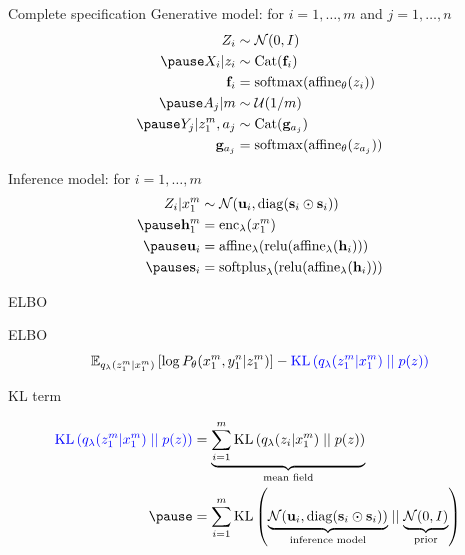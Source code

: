 \begin{frame}[plain]{Complete specification}
Generative model: for $i=1, \ldots, m$ and $j=1, \ldots, n$ \pause
\begin{equation*}
\begin{aligned}
Z_i &\sim \mathcal N(0, I) \\ \pause
X_i|z_i &\sim \Cat(\mathbf f_i) \\ 
\mathbf f_i &= \softmax(\affine_\theta(z_i)) \\ \pause
A_j|m &\sim \mathcal U(1/m) \\ \pause
Y_j|z_1^m, a_j &\sim \Cat(\mathbf g_{a_j}) \\
\mathbf g_{a_j} &= \softmax(\affine_\theta(z_{a_j}))
\end{aligned}
\end{equation*}

Inference model: for $i=1, \ldots, m$ \pause
\begin{equation*}
\begin{aligned}
Z_i|x_1^m &\sim \mathcal N(\mathbf u_i, \diag(\mathbf s_i \odot \mathbf s_i))\\ \pause
\mathbf h_1^m &= \text{enc}_\lambda(x_1^m) \\ \pause
\mathbf u_i &= \text{affine}_\lambda(\relu(\text{affine}_\lambda(\mathbf h_i)))\\ \pause
\mathbf s_i &= \softplus_\lambda(\relu(\text{affine}_\lambda(\mathbf h_i))) 
\end{aligned}
\end{equation*}

\end{frame}

\begin{frame}{ELBO}

ELBO
\begin{equation*}
\begin{aligned}
\mathbb E_{q_\lambda(z_1^m|x_1^m)}\left[ \log P_\theta(x_1^m, y_1^n|z_1^m)\right] - \textcolor{blue}{\operatorname{KL}\left(q_\lambda(z_1^m|x_1^m)\mid\mid p(z)\right) }
\end{aligned}
\end{equation*}

\pause

KL term
\begin{small}
\begin{equation*}
\begin{aligned}
\textcolor{blue}{\KL{q_\lambda(z_1^m|x_1^m)}{p(z)} }
&= \underbrace{\sum_{i=1}^m \KL{q_\lambda(z_i|x_1^m)}{p(z)}}_{\text{mean field}} \\ \pause
&= \sum_{i=1}^m \KL{\underbrace{\mathcal N(\mathbf u_i, \diag(\mathbf s_i \odot \mathbf s_i))}_{\text{inference model}}}{\underbrace{\mathcal N(0, I)}_{\text{prior}}} \
\end{aligned}
\end{equation*}
\end{small}


\end{frame}

